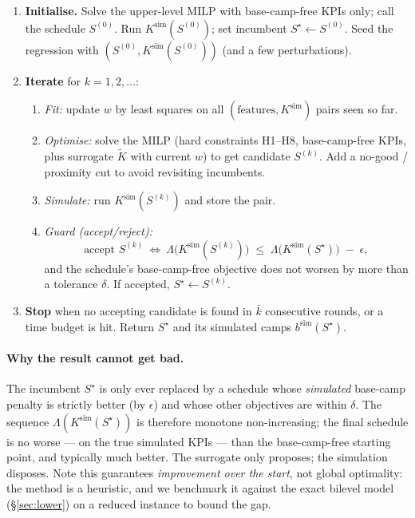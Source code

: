 \documentclass[12pt, letterpaper]{article}
\begin{document}
\begin{enumerate}[leftmargin=1.7em, itemsep=2pt]
  \item \textbf{Initialise.} Solve the upper-level MILP with base-camp-free
        KPIs only; call the schedule $S^{(0)}$. Run
        $K^{\mathrm{sim}}(S^{(0)})$; set incumbent
        $S^\star\!\leftarrow\!S^{(0)}$. Seed the regression with
        $(S^{(0)},K^{\mathrm{sim}}(S^{(0)}))$ (and a few perturbations).
  \item \textbf{Iterate} for $k=1,2,\dots$:
    \begin{enumerate}[leftmargin=1.4em, itemsep=1pt]
      \item \emph{Fit:} update $w$ by least squares on all
            $(\text{features},K^{\mathrm{sim}})$ pairs seen so far.
      \item \emph{Optimise:} solve the MILP (hard constraints H1--H8,
            base-camp-free KPIs, plus surrogate $\widetilde K$ with current
            $w$) to get candidate $S^{(k)}$. Add a no-good / proximity cut
            to avoid revisiting incumbents.
      \item \emph{Simulate:} run $K^{\mathrm{sim}}(S^{(k)})$ and store the
            pair.
      \item \emph{Guard (accept/reject):}
            \begin{equation}
            \text{accept } S^{(k)}\ \Longleftrightarrow\
            \Lambda\bigl(K^{\mathrm{sim}}(S^{(k)})\bigr)\;\le\;
            \Lambda\bigl(K^{\mathrm{sim}}(S^\star)\bigr)
            \;-\;\epsilon,
            \end{equation}
            and the schedule's base-camp-free objective does not worsen by
            more than a tolerance $\delta$. If accepted,
            $S^\star\!\leftarrow\!S^{(k)}$.
    \end{enumerate}
  \item \textbf{Stop} when no accepting candidate is found in $\bar k$
        consecutive rounds, or a time budget is hit. Return $S^\star$ and
        its simulated camps $b^{\mathrm{sim}}(S^\star)$.
\end{enumerate}

\paragraph{Why the result cannot get bad.} The incumbent $S^\star$ is only
ever replaced by a schedule whose \emph{simulated} base-camp penalty is
strictly better (by $\epsilon$) and whose other objectives are within
$\delta$. The sequence
$\Lambda(K^{\mathrm{sim}}(S^\star))$ is therefore monotone
non-increasing; the final schedule is no worse --- on the true
simulated KPIs --- than the base-camp-free starting point, and typically
much better. The surrogate only proposes; the simulation disposes. Note
this guarantees \emph{improvement over the start}, not global optimality:
the method is a heuristic, and we benchmark it against the exact bilevel
model (\S\ref{sec:lower}) on a reduced instance to bound the gap.
\end{document}
